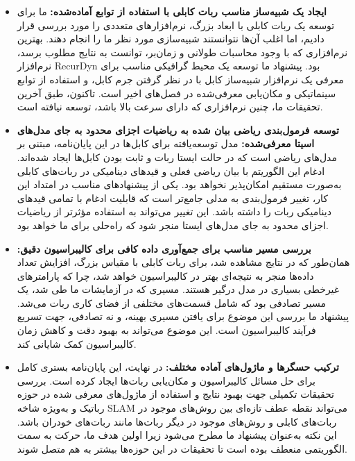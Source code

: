 \begin{itemize}
\item \textbf{ایجاد یک شبیه‌ساز مناسب ربات کابلی با استفاده از توابع آماده‌شده:}
ما برای توسعه یک ربات کابلی با ابعاد بزرگ، نرم‌افزارهای متعددی را مورد بررسی قرار دادیم، اما اغلب آن‌ها نتوانستند شبیه‌سازی مورد نظر ما را انجام دهند. بهترین نرم‌افزاری که با وجود محاسبات طولانی و زمان‌بر، توانست به نتایج مطلوب برسد، نرم‌افزار RecurDyn بود. پیشنهاد ما توسعه یک محیط گرافیکی مناسب برای معرفی یک نرم‌افزار شبیه‌ساز کابل با در نظر گرفتن جرم کابل، و استفاده از توابع سینماتیکی و مکان‌یابی معرفی‌شده در فصل‌های اخیر است. تاکنون، طبق آخرین تحقیقات ما، چنین نرم‌افزاری که دارای سرعت بالا باشد، توسعه نیافته است.

\item \textbf{توسعه فرمول‌بندی ریاضی بیان شده به ریاضیات اجزای محدود به جای مدل‌های اسیتا معرفی‌شده:}
مدل توسعه‌یافته برای کابل‌ها در این پایان‌نامه، مبتنی بر مدل‌های ریاضی است که در حالت ایستا ربات و ثابت بودن کابل‌ها ایجاد شده‌اند. ادغام این الگوریتم با بیان ریاضی فعلی و قیدهای دینامیکی در ربات‌های کابلی به‌صورت مستقیم امکان‌پذیر نخواهد بود. یکی از پیشنهادهای مناسب در امتداد این کار، تغییر فرمول‌بندی به مدلی جامع‌تر است که قابلیت ادغام با تمامی قیدهای دینامیکی ربات را داشته باشد. این تغییر می‌تواند به استفاده مؤثرتر از ریاضیات اجزای محدود به جای مدل‌های ایستا منجر شود که راه‌حلی برای ما خواهد بود.

\item \textbf{بررسی مسیر مناسب برای جمع‌آوری داده کافی برای کالیبراسیون دقیق:}
همان‌طور که در نتایج مشاهده شد، برای ربات کابلی با مقیاس بزرگ، افزایش تعداد داده‌ها منجر به نتیجه‌ای بهتر در کالیبراسیون خواهد شد، چرا که پارامترهای غیرخطی بسیاری در مدل درگیر هستند. مسیری که در آزمایشات ما طی شد، یک مسیر تصادفی بود که شامل قسمت‌های مختلفی از فضای کاری ربات می‌شد. پیشنهاد ما بررسی این موضوع برای یافتن مسیری بهینه، و نه تصادفی، جهت تسریع فرآیند کالیبراسیون است. این موضوع می‌تواند به بهبود دقت و کاهش زمان کالیبراسیون کمک شایانی کند.


\item \textbf{ترکیب حسگر‌ها و ماژول‌های آماده مختلف:}
در نهایت، این پایان‌نامه بستری کامل برای حل مسائل کالیبراسیون و مکان‌یابی ربات‌ها ایجاد کرده است. بررسی تحقیقات تکمیلی جهت بهبود نتایج و استفاده از ماژول‌های معرفی شده در حوزه رباتیک و به‌ویژه شاخه SLAM می‌تواند نقطه عطف تازه‌ای بین روش‌های موجود در ربات‌های کابلی و روش‌های موجود در دیگر ربات‌ها مانند ربات‌های خودران باشد. این نکته به‌عنوان پیشنهاد ما مطرح می‌شود زیرا اولین هدف ما، حرکت به سمت الگوریتمی منعطف بوده است تا تحقیقات در این حوزه‌ها بیشتر به هم متصل شوند.


\end{itemize}
